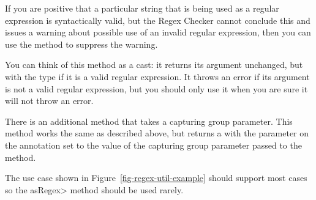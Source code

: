 If you are positive that a particular string that is being used as a
regular expression is syntactically valid, but the Regex Checker cannot
conclude this and issues a warning about possible use of an invalid regular
expression, then you can use the
 method to suppress the
warning.

You can think of this method
as a cast:  it returns its argument unchanged, but with the type
 if it is a valid regular expression.  It throws an
error if its argument is not a valid regular expression, but you should
only use it when you are sure it will not throw an error.

There is an additional 
method that takes a capturing group parameter. This method works the same as
described above, but returns a  with the parameter on the
annotation set to the value of the capturing group parameter passed to the method.

The use case shown in Figure~\ref{fig-regex-util-example} should support most cases
so the \<asRegex> method should be used rarely.





